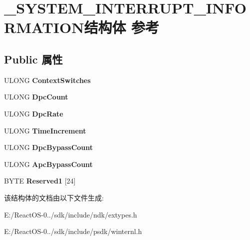 \hypertarget{struct___s_y_s_t_e_m___i_n_t_e_r_r_u_p_t___i_n_f_o_r_m_a_t_i_o_n}{}\section{\+\_\+\+S\+Y\+S\+T\+E\+M\+\_\+\+I\+N\+T\+E\+R\+R\+U\+P\+T\+\_\+\+I\+N\+F\+O\+R\+M\+A\+T\+I\+O\+N结构体 参考}
\label{struct___s_y_s_t_e_m___i_n_t_e_r_r_u_p_t___i_n_f_o_r_m_a_t_i_o_n}
\subsection*{Public 属性}
\begin{DoxyCompactItemize}
\item 
\mbox{\label{struct___s_y_s_t_e_m___i_n_t_e_r_r_u_p_t___i_n_f_o_r_m_a_t_i_o_n_a0533bce47e285b23ad70be1390f23c97}} 
U\+L\+O\+NG {\bfseries Context\+Switches}
\item 
\mbox{\label{struct___s_y_s_t_e_m___i_n_t_e_r_r_u_p_t___i_n_f_o_r_m_a_t_i_o_n_ae0b1d32369c7a73f594bb6bc25573108}} 
U\+L\+O\+NG {\bfseries Dpc\+Count}
\item 
\mbox{\label{struct___s_y_s_t_e_m___i_n_t_e_r_r_u_p_t___i_n_f_o_r_m_a_t_i_o_n_ad80ab32bbe03b0eab4cfb784c8df2feb}} 
U\+L\+O\+NG {\bfseries Dpc\+Rate}
\item 
\mbox{\label{struct___s_y_s_t_e_m___i_n_t_e_r_r_u_p_t___i_n_f_o_r_m_a_t_i_o_n_a67078285f7dd9ac16ed766c226bb536f}} 
U\+L\+O\+NG {\bfseries Time\+Increment}
\item 
\mbox{\label{struct___s_y_s_t_e_m___i_n_t_e_r_r_u_p_t___i_n_f_o_r_m_a_t_i_o_n_a64c4d1df369231e515e3bdd0e2e96817}} 
U\+L\+O\+NG {\bfseries Dpc\+Bypass\+Count}
\item 
\mbox{\label{struct___s_y_s_t_e_m___i_n_t_e_r_r_u_p_t___i_n_f_o_r_m_a_t_i_o_n_a6675846812d5d49c6222f12b2cd473f4}} 
U\+L\+O\+NG {\bfseries Apc\+Bypass\+Count}
\item 
\mbox{\label{struct___s_y_s_t_e_m___i_n_t_e_r_r_u_p_t___i_n_f_o_r_m_a_t_i_o_n_a2c7306d138a161f22980955f5e931157}} 
B\+Y\+TE {\bfseries Reserved1} \mbox{[}24\mbox{]}
\end{DoxyCompactItemize}


该结构体的文档由以下文件生成\+:\begin{DoxyCompactItemize}
\item 
E\+:/\+React\+O\+S-\/0../sdk/include/ndk/extypes.\+h\item 
E\+:/\+React\+O\+S-\/0../sdk/include/psdk/winternl.\+h\end{DoxyCompactItemize}
